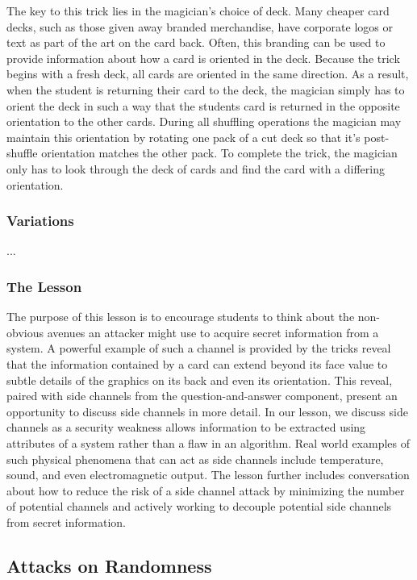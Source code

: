 The key to this trick lies in the magician's choice of deck.  Many cheaper card
decks, such as those given away branded merchandise, have corporate logos or
text as part of the art on the card back.  Often, this branding can be used to
provide information about how a card is oriented in the deck.  Because the trick
begins with a fresh deck, all cards are oriented in the same direction.  As a
result, when the student is returning their card to the deck, the magician
simply has to orient the deck in such a way that the students card is returned
in the opposite orientation to the other cards.  During all shuffling
operations the magician may maintain this orientation by rotating one pack of a
cut deck so that it's post-shuffle orientation matches the other pack.
To complete the trick, the magician only has to look through the deck of cards
and find the card with a differing orientation.

\subsubsection{Variations}

...

\subsubsection{The Lesson}

The purpose of this lesson is to encourage students to think about the
non-obvious avenues an attacker might use to acquire secret information from a
system.  A powerful example of such a channel is provided by the tricks reveal
that the information contained by a card can extend beyond its face value to
subtle details of the graphics on its back and even its orientation.  This
reveal, paired with side channels from the question-and-answer component,
present an opportunity to discuss side channels in more detail.
In our lesson, we discuss side channels as
a security weakness allows information to be extracted using attributes
of a system rather than a flaw in an
algorithm.
Real world examples of such
physical phenomena
that can act as side channels
include temperature,
sound,
and even electromagnetic output.
The lesson further includes conversation about how to
reduce the risk of a side channel attack
by minimizing the number of potential channels
and actively working to decouple potential
side channels from secret information.

\subsection{Attacks on Randomness}


